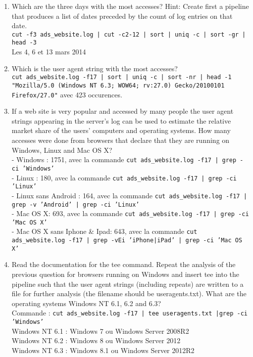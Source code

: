 \documentclass[a4paper,11pt]{article}
\newcounter{commande}[subsection]
\begin{document}
\begin{enumerate}
        \item Which are the three days with the most accesses? Hint: Create first a pipeline that produces a list of dates preceded by the count of log entries on that date.\\
        \texttt{cut -f3 ads\_website.log | cut -c2-12 | sort | uniq -c | sort -gr | head -3}\\
        Les 4, 6 et 13 mars 2014

        \item Which is the user agent string with the most accesses?\\
        \texttt{cut ads\_website.log -f17 | sort | uniq -c | sort -nr | head -1}\\
        \texttt{"Mozilla/5.0 (Windows NT 6.3; WOW64; rv:27.0) Gecko/20100101 Firefox/27.0"} avec 423 occurences.\\


        \item If a web site is very popular and accessed by many people the user agent strings appearing in the server's log can be used to estimate the relative market share of the users' computers and operating systems. How many accesses were done from browsers that declare that they are running on Windows, Linux and Mac OS X? \\
        - Windows : 1751, avec la commande \texttt{cut ads\_website.log -f17 | grep -ci 'Windows'} \\
        - Linux : 180, avec la commande \texttt{cut ads\_website.log -f17 | grep -ci 'Linux'
        }\\
        - Linux sans Android : 164, avec la commande \texttt{cut ads\_website.log -f17 | grep -v 'Android' | grep -ci 'Linux'}\\
        - Mac OS X: 693, avec la commande \texttt{cut ads\_website.log -f17 | grep -ci 'Mac OS X'
        }\\
        - Mac OS X sans Iphone \& Ipad: 643, avec la commande \texttt{cut ads\_website.log -f17 | grep -vEi 'iPhone|iPad' | grep -ci 'Mac OS X' }\\

        \item Read the documentation for the tee command. Repeat the analysis of the previous question for browsers running on Windows and insert tee into the pipeline such that the user agent strings (including repeats) are written to a file for further analysis (the filename should be useragents.txt). What are the operating systems Windows NT 6.1, 6.2 and 6.3?\\
        Commande : \texttt{cut ads\_website.log -f17 | tee useragents.txt |grep -ci 'Windows'}\\
        Windows NT 6.1 : Windows 7 ou Windows Server 2008R2\\
        Windows NT 6.2 : Windows 8 ou Windows Server 2012\\
        Windows NT 6.3 : Windows 8.1 ou Windows Server 2012R2\\



\end{enumerate}
\end{document}
